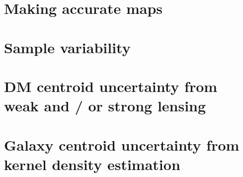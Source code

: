\section{Making accurate maps}

\section{Sample variability} 

\section{DM centroid uncertainty from weak and / or strong lensing}

\section{Galaxy centroid uncertainty from kernel density estimation}
